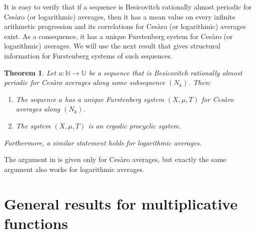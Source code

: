 \documentclass[11pt]{amsart}
\newtheorem{theorem}[lemma]{Theorem}
\theoremstyle{definition}
\newtheorem*{remarks}{Remarks}
\newcommand{\N}{{\mathbb N}}
\newcommand{\U}{{\mathbb U}}
\begin{document}
 It is easy to verify that if a sequence is  Besicovitch rationally almost periodic  for Ces\`aro (or logarithmic) averages, then it  has a mean value on every infinite arithmetic progression and its correlations for Ces\`aro (or logarithmic) averages exist. As
  a consequence, it has a unique Furstenberg system for Ces\`aro (or logarithmic) averages.
 We will use the next result that gives structural information for Furstenberg systems of such sequences.
 \begin{theorem}{\cite[Theorem~3.12]{BPLR19}}\label{T:BRAP}
 	Let $a\colon \N\to \U$ be a sequence that is
 	Besicovitch rationally almost periodic for Ces\`aro averages along some subsequence  $(N_k)$.
 	Then:
 	\begin{enumerate}
\item  	The sequence $a$ has a unique Furstenberg system  $(X,\mu,T)$ for Ces\`aro averages along $(N_k)$.

\smallskip

\item The system $(X,\mu,T)$  is an ergodic procyclic system.
 \end{enumerate}
 	Furthermore, a similar statement holds for logarithmic averages. 	
 \end{theorem}
The argument in \cite{BPLR19} is given only for Ces\`aro averages, but exactly the same argument also works for logarithmic averages. 	 




	\section{General results for  multiplicative functions}
\end{document}
